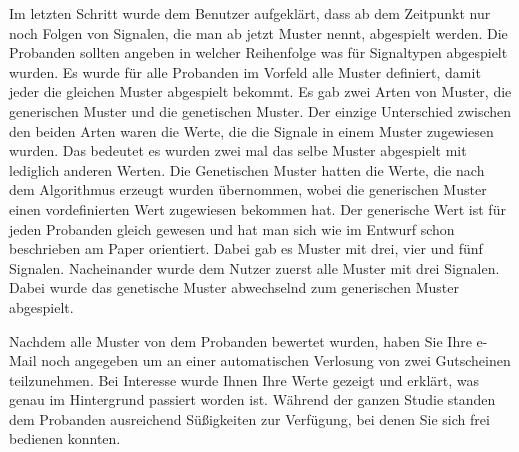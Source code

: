 Im letzten Schritt wurde dem Benutzer aufgekl{\"a}rt, dass ab dem Zeitpunkt nur noch Folgen von Signalen, die man ab jetzt Muster nennt, abgespielt werden. Die Probanden sollten angeben in welcher Reihenfolge was f{\"u}r Signaltypen abgespielt wurden. Es wurde f{\"u}r alle Probanden im Vorfeld alle Muster definiert, damit jeder die gleichen Muster abgespielt bekommt. Es gab zwei Arten von Muster, die generischen Muster und die genetischen Muster. Der einzige Unterschied zwischen den beiden Arten waren die Werte, die die Signale in einem Muster zugewiesen wurden. Das bedeutet es wurden zwei mal das selbe Muster abgespielt mit lediglich anderen Werten. Die Genetischen Muster hatten die Werte, die nach dem Algorithmus erzeugt wurden {\"u}bernommen, wobei die generischen Muster einen vordefinierten Wert zugewiesen bekommen hat. Der generische Wert ist f{\"u}r jeden Probanden gleich gewesen und hat man sich wie im Entwurf schon beschrieben am Paper \cite{pescara2016ruttelflug} orientiert.
Dabei gab es Muster mit drei, vier und f{\"u}nf Signalen. Nacheinander wurde dem Nutzer zuerst alle Muster mit drei Signalen. Dabei wurde das genetische Muster abwechselnd zum generischen Muster abgespielt. 

Nachdem alle Muster von dem Probanden bewertet wurden, haben Sie Ihre e-Mail noch angegeben um an einer automatischen Verlosung von zwei Gutscheinen teilzunehmen. Bei Interesse wurde Ihnen Ihre Werte gezeigt und erkl{\"a}rt, was genau im Hintergrund passiert worden ist. W{\"a}hrend der ganzen Studie standen dem Probanden ausreichend S{\"u}{\ss}igkeiten zur Verf{\"u}gung, bei denen Sie sich frei bedienen konnten.

